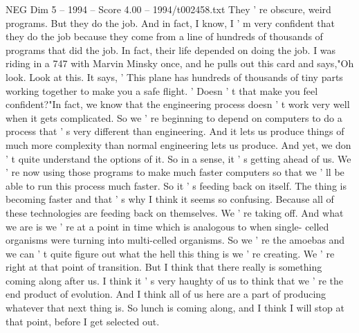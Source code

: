\begin{textsample}{NEG Dim 5 – 1994 – Score 4.00 – 1994/t002458.txt}
They ' re obscure, weird programs.
But they do the job.
And in fact, I know, I ' m very confident that they do the job because they come from a line of hundreds of thousands of programs that did the job.
In fact, their life depended on doing the job.
I was riding in a 747 with Marvin Minsky once, and he pulls out this card and says,"Oh look.
Look at this.
It says, ' This plane has hundreds of thousands of tiny parts working together to make you a safe flight. ' Doesn ' t that make you feel confident?"In fact, we know that the engineering process doesn ' t work very well when it gets complicated.
So we ' re beginning to depend on computers to do a process that ' s very different than engineering.
And it lets us produce things of much more complexity than normal engineering lets us produce.
And yet, we don ' t quite understand the options of it.
So in a sense, it ' s getting ahead of us.
We ' re now using those programs to make much faster computers so that we ' ll be able to run this process much faster.
So it ' s feeding back on itself.
The thing is becoming faster and that ' s why I think it seems so confusing.
Because all of these technologies are feeding back on themselves.
We ' re taking off.
And what we are is we ' re at a point in time which is analogous to when single- celled organisms were turning into multi-celled organisms.
So we ' re the amoebas and we can ' t quite figure out what the hell this thing is we ' re creating.
We ' re right at that point of transition.
But I think that there really is something coming along after us.
I think it ' s very haughty of us to think that we ' re the end product of evolution.
And I think all of us here are a part of producing whatever that next thing is.
So lunch is coming along, and I think I will stop at that point, before I get selected out.

\end{textsample}
